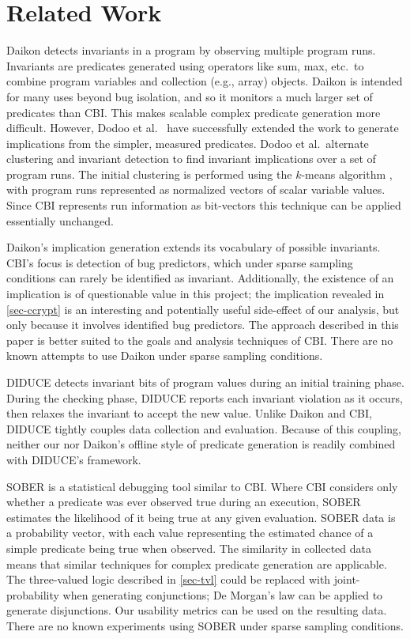 
\section{Related Work}
\label{sec-related-work}
Daikon \cite{ErnstPGMPTX2006} detects invariants in a program by observing multiple program runs.  Invariants are predicates generated using operators like sum, max, etc.\ to combine program variables and collection (e.g., array) objects.  Daikon is intended for many uses beyond bug isolation, and so it monitors a much larger set of predicates than CBI.  This makes scalable complex predicate generation more difficult.  However, Dodoo et al.\ \cite{ErnstDRAFT} have successfully extended the work to generate implications from the simpler, measured predicates.  Dodoo et al.\ alternate clustering and invariant detection to find invariant implications over a set of program runs.  The initial clustering is performed using the $k$-means algorithm \cite{jain99data}, with program runs represented as normalized vectors of scalar variable values.  Since CBI represents run information as bit-vectors this technique can be applied essentially unchanged.

Daikon's implication generation extends its vocabulary of possible invariants.  CBI's focus is detection of bug predictors, which under sparse sampling conditions can rarely be identified as invariant.  Additionally, the existence of an implication is of questionable value in this project; the implication revealed in \autoref{sec-ccrypt} is an interesting and potentially useful side-effect of our analysis, but only because it involves identified bug predictors.  The approach described in this paper is better suited to the goals and analysis techniques of CBI\@.  There are no known attempts to use Daikon under sparse sampling conditions.

DIDUCE \cite{581377} detects invariant bits of program values during an initial training phase.  During the checking phase, DIDUCE reports each invariant violation as it occurs, then relaxes the invariant to accept the new value.  Unlike Daikon and CBI, DIDUCE tightly couples data collection and evaluation.  Because of this coupling, neither our nor Daikon's offline style of predicate generation is readily combined with DIDUCE's framework.

SOBER \cite{1081753} is a statistical debugging tool similar to CBI\@.  Where CBI considers only whether a predicate was ever observed true during an execution, SOBER estimates the likelihood of it being true at any given evaluation.  SOBER data is a probability vector, with each value representing the estimated chance of a simple predicate being true when observed.  The similarity in collected data means that similar techniques for complex predicate generation are applicable.  The three-valued logic described in \autoref{sec-tvl} could be replaced with joint-probability when generating conjunctions; De Morgan's law can be applied to generate disjunctions.  Our usability metrics can be used on the resulting data.  There are no known experiments using SOBER under sparse sampling conditions.  

